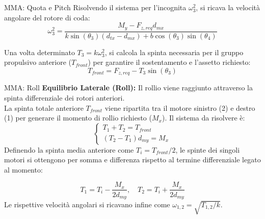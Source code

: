 \documentclass[aspectratio=169]{beamer} %
\begin{document}
\begin{frame}{MMA: Quota e Pitch}
    Risolvendo il sistema per l'incognita $\omega_{3}^2$, si ricava la velocità angolare del rotore di coda:
    \begin{equation}
        \omega_3^2 = \frac{M_y - F_{z,req} d_{mx}}{k \sin(\theta_3) (d_{tx} - d_{mx}) + b \cos(\theta_3) \sin(\theta_4)}
    \end{equation}
    
    \vspace{0.3cm}
    Una volta determinato $T_3 = k \omega_3^2$, si calcola la spinta necessaria per il gruppo propulsivo anteriore ($T_{front}$) per garantire il sostentamento e l'assetto richiesto:
    \begin{equation}
        T_{front} = F_{z,req} - T_3 \sin(\theta_3)
    \end{equation}
    
    \vspace{0.3cm}
\end{frame}

\begin{frame}{MMA: Roll}
    \textbf{Equilibrio Laterale (Roll):}
    Il rollio viene raggiunto attraverso la spinta differenziale dei rotori anteriori.\\
    La spinta totale anteriore $T_{front}$ viene ripartita tra il motore sinistro (2) e destro (1) per generare il momento di rollio richiesto ($M_x$).
    Il sistema da risolvere è:
    \begin{equation}
        \begin{cases}
        T_1 + T_2 = T_{front} \\
        (T_2 - T_1) d_{my} = M_x
        \end{cases}
    \end{equation}
    Definendo la spinta media anteriore come $T_i = T_{front} / 2$, le spinte dei singoli motori si ottengono per somma e differenza rispetto al termine differenziale legato al momento:

    \begin{equation}
        T_1 = T_i - \frac{M_x}{2 d_{my}}, \quad T_2 = T_i + \frac{M_x}{2 d_{my}}
    \end{equation}
    Le rispettive velocità angolari si ricavano infine come $\omega_{1,2} = \sqrt{T_{1,2}/k}$.
\end{frame}
\end{document}
